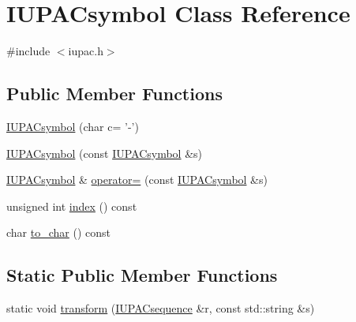 \hypertarget{class_i_u_p_a_csymbol}{\section{I\+U\+P\+A\+Csymbol Class Reference}
\label{class_i_u_p_a_csymbol}
}


{\ttfamily \#include $<$iupac.\+h$>$}

\subsection*{Public Member Functions}
\begin{DoxyCompactItemize}
\item 
\hyperlink{class_i_u_p_a_csymbol_a6e81e2f20f4a41af5a3bef0be99b7a21}{I\+U\+P\+A\+Csymbol} (char c= '-\/')
\item 
\hyperlink{class_i_u_p_a_csymbol_a84bbe260e0baf5795575661898f771a5}{I\+U\+P\+A\+Csymbol} (const \hyperlink{class_i_u_p_a_csymbol}{I\+U\+P\+A\+Csymbol} \&s)
\item 
\hyperlink{class_i_u_p_a_csymbol}{I\+U\+P\+A\+Csymbol} \& \hyperlink{class_i_u_p_a_csymbol_a5ac6218eeee6a281bafcc3d4021b2bd8}{operator=} (const \hyperlink{class_i_u_p_a_csymbol}{I\+U\+P\+A\+Csymbol} \&s)
\item 
unsigned int \hyperlink{class_i_u_p_a_csymbol_ae180bb7af881834ef960724ebbb815a0}{index} () const 
\item 
char \hyperlink{class_i_u_p_a_csymbol_ae940f3942ea09fc254beb22327ac9804}{to\+\_\+char} () const 
\end{DoxyCompactItemize}
\subsection*{Static Public Member Functions}
\begin{DoxyCompactItemize}
\item 
static void \hyperlink{class_i_u_p_a_csymbol_a51951cb7bac3f7ca28171bd4ac76a5b9}{transform} (\hyperlink{iupac_8h_a364ef750df8d90674fae75b030363cc2}{I\+U\+P\+A\+Csequence} \&r, const std\+::string \&s)
\end{DoxyCompactItemize}


